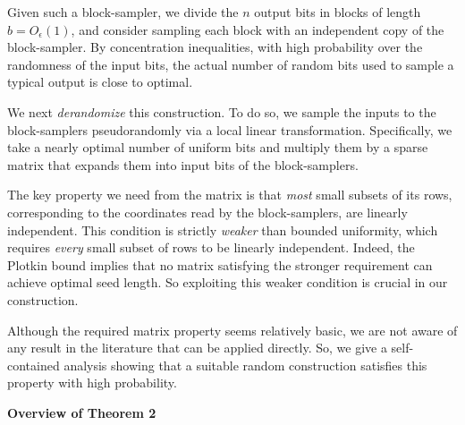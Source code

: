 \documentclass[10pt,a4paper]{article}
\begin{document}
Given such a block-sampler, we divide the $n$ output bits in blocks of length $b=O_{\epsilon}(1)$, and consider sampling each block with an independent copy of the block-sampler. By concentration inequalities, with high probability over the randomness of the input bits, the actual number of random bits used to sample a typical output is close to optimal.\par




We next \emph{derandomize} this construction. To do so, we sample the inputs to the block-samplers pseudorandomly via a local linear transformation. Specifically, we take a nearly optimal number of uniform bits and multiply them by a sparse matrix that expands them into input bits of the block-samplers.\par




The key property we need from the matrix is that \emph{most} small subsets of its rows, corresponding to the coordinates read by the block-samplers, are linearly independent.
This condition is strictly \emph{weaker} than bounded uniformity, which requires \emph{every} small subset of rows to be linearly independent.
Indeed, the Plotkin bound implies that no matrix satisfying the stronger requirement can achieve optimal seed length.
So exploiting this weaker condition is crucial in our construction.\par




Although the required matrix property seems relatively basic, we are not aware of any result in the literature that can be applied directly. So, we give a self-contained analysis showing that a suitable random construction satisfies this property with high probability.\par





\par\medskip\noindent\textbf{Overview of Theorem 2
}\par
\end{document}
